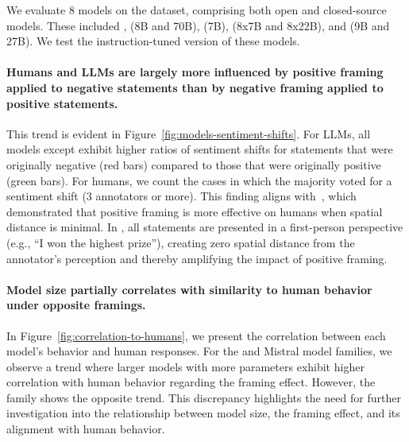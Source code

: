 


We evaluate 8 models on the \name{} dataset, comprising both open and closed-source models. These included \gpt, \llama{} (8B and 70B), \mistral{} (7B), \mixtral{} (8x7B and 8x22B), and \gemma{} (9B and 27B). We test the instruction-tuned version of these models.



\paragraph{Humans and LLMs are largely more influenced by positive framing applied to negative statements than by negative framing applied to positive statements.} 
This trend is evident in Figure~\ref{fig:models-sentiment-shifts}. For LLMs, all models except \gpt{} exhibit higher ratios of sentiment shifts for statements that were originally negative (red bars) compared to those that were originally positive (green bars). For humans, we count the cases in which the majority voted for a sentiment shift (3 annotators or more). 
This finding aligns with~\citet{tong2021good}, which demonstrated that positive framing is more effective on humans when spatial distance is minimal. In \name{}, all statements are presented in a first-person perspective (e.g., ``I won the highest prize''), creating zero spatial distance from the annotator's perception and thereby amplifying the impact of positive framing.






\paragraph{Model size partially correlates with similarity to human behavior under opposite framings.}
In Figure~\ref{fig:correlation-to-humans}, we present the correlation between each model's behavior and human responses. For the \llama{} and Mistral model families, we observe a trend where larger models with more parameters exhibit higher correlation with human behavior regarding the framing effect. However, the \gemma{} family shows the opposite trend. This discrepancy highlights the need for further investigation into the relationship between model size, the framing effect, and its alignment with human behavior.


